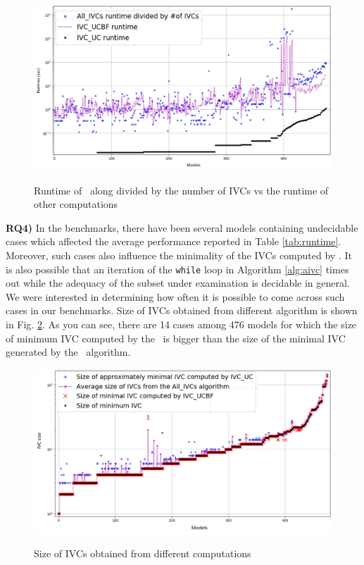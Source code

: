  \begin{figure}
 \centering
  \includegraphics[width=\textwidth]{figs/ratio.jpg}
  \label{fig:ratio}
  \vspace{-0.2in}
  \caption{Runtime of \aivcalg ~along divided by the number of IVCs vs the runtime of other computations}
\end{figure}

\vspace{0.1in}
\textbf{RQ4)} In the benchmarks, there have been 
several models containing undecidable cases which affected the average 
performance reported in Table \ref{tab:runtime}. Moreover, such cases also influence the minimality of the IVCs computed by \aivcalg. It is also possible that an iteration of 
the \texttt{while} loop in Algorithm \ref{alg:aivc} times out while 
the adequacy of the subset under examination is decidable in general. 
We were interested in determining how often it is possible to come across such cases in our benchmarks. Size of IVCs obtained from different algorithm is shown in Fig. \ref{fig:min}. 
As you can see, there are 14 cases among 476 models for which the size of
 minimum IVC computed by the \aivcalg ~is bigger than the size of the minimal IVC 
 generated by the \ucbfalg ~algorithm. 
 \begin{figure}
 \centering
  \includegraphics[width=\textwidth]{figs/min.jpg}
  \label{fig:min}
  \vspace{-0.2in}
  \caption{Size of IVCs obtained from different computations}
\end{figure}
